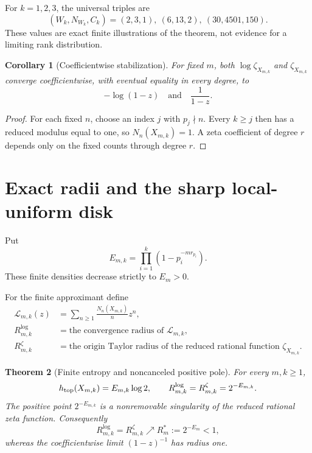 \documentclass[11pt]{article}
\numberwithin{equation}{section}
\newtheorem{theorem}{Theorem}[section]
\newtheorem{corollary}[theorem]{Corollary}
\theoremstyle{remark}
\newcommand{\cL}{\mathcal L}
\begin{document}
For $k=1,2,3$, the universal triples are
\[
 (W_k,N_{W_k},C_k)=(2,3,1),\ (6,13,2),\ (30,4501,150).
\]
These values are exact finite illustrations of the theorem, not evidence
for a limiting rank distribution.

\begin{corollary}[Coefficientwise stabilization]
\label{cor:coefficientwise}
For fixed $m$, both $\log\zeta_{X_{m,k}}$ and
\(\zeta_{X_{m,k}}\) converge coefficientwise, with eventual equality in
every degree, to
\[
 -\log(1-z)
 \quad\text{and}\quad
 \frac1{1-z}.
\]
\end{corollary}

\begin{proof}
For each fixed $n$, choose an index $j$ with $p_j\nmid n$.  Every
$k\ge j$ then has a reduced modulus equal to one, so $N_n(X_{m,k})=1$.
A zeta coefficient of degree $r$ depends only on the fixed counts through
degree $r$.
\end{proof}

\section{Exact radii and the sharp local-uniform disk}

Put
\begin{equation}
 E_{m,k}=\prod_{i=1}^k(1-p_i^{-m r_{p_i}}).
 \label{eq:finite-density}
\end{equation}
These finite densities decrease strictly to $E_m>0$.

For the finite approximant define
\begin{align*}
 \cL_{m,k}(z)
 &=\sum_{n\ge1}\frac{N_n(X_{m,k})}{n}z^n,\\
 R_{m,k}^{\log}
 &=\text{the convergence radius of }\cL_{m,k},\\
 R_{m,k}^{\zeta}
 &=\text{the origin Taylor radius of the reduced rational function }
   \zeta_{X_{m,k}}.
\end{align*}

\begin{theorem}[Finite entropy and noncanceled positive pole]
\label{thm:radii}
For every $m,k\ge1$,
\begin{equation}
 h_{\rm top}(X_{m,k})=E_{m,k}\log2,
 \qquad
 R_{m,k}^{\log}=R_{m,k}^{\zeta}
 =2^{-E_{m,k}}.
 \label{eq:finite-radii}
\end{equation}
The positive point $2^{-E_{m,k}}$ is a nonremovable singularity of the
reduced rational zeta function.  Consequently
\begin{equation}
 R_{m,k}^{\log}=R_{m,k}^{\zeta}
 \nearrow R_m^*:=2^{-E_m}<1,
 \label{eq:radius-limit}
\end{equation}
whereas the coefficientwise limit $(1-z)^{-1}$ has radius one.
\end{theorem}
\end{document}
